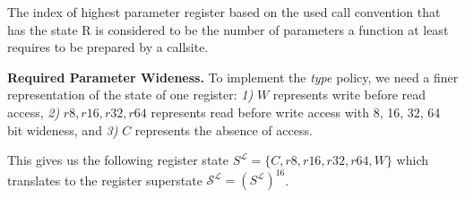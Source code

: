%
%
%

The index of highest parameter register based on the used call convention that has the state R is considered to be the number of parameters a function at least requires to be prepared by a callsite.

\textbf{Required Parameter Wideness.}
\label{subsection:requiredparamwideness}
To implement the \emph{type} policy, we need a finer representation of the state of one register:
\textit{1)} $W$ represents write before read access,
\textit{2)} $r8, r16, r32, r64$ represents read before write access with 8, 16, 32, 64 bit wideness, and
\textit{3)} $C$ represents the absence of access.

This gives us the following register state $S^\mathcal{L} = \{ C, r8, r16, r32, r64, W \}$ which translates to the register superstate 
$\mathcal{S}^\mathcal{L} = (S^\mathcal{L})^{16}$.

